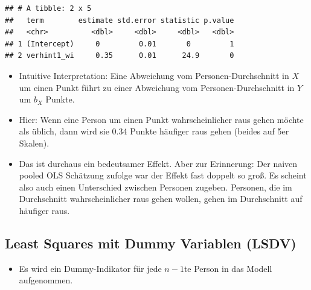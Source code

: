 \documentclass[
]{book}
\newenvironment{Shaded}{\begin{snugshade}}{\end{snugshade}}
\newcommand{\DataTypeTok}[1]{\textcolor[rgb]{0.13,0.29,0.53}{#1}}
\newcommand{\DecValTok}[1]{\textcolor[rgb]{0.00,0.00,0.81}{#1}}
\newcommand{\KeywordTok}[1]{\textcolor[rgb]{0.13,0.29,0.53}{\textbf{#1}}}
\newcommand{\NormalTok}[1]{#1}
\newcommand{\OperatorTok}[1]{\textcolor[rgb]{0.81,0.36,0.00}{\textbf{#1}}}
\newcommand{\StringTok}[1]{\textcolor[rgb]{0.31,0.60,0.02}{#1}}
\providecommand{\tightlist}{%
  \setlength{\itemsep}{0pt}\setlength{\parskip}{0pt}}
\begin{document}
\begin{Shaded}
\end{Shaded}

\begin{verbatim}
## # A tibble: 2 x 5
##   term        estimate std.error statistic p.value
##   <chr>          <dbl>     <dbl>     <dbl>   <dbl>
## 1 (Intercept)     0         0.01       0         1
## 2 verhint1_wi     0.35      0.01      24.9       0
\end{verbatim}

\begin{itemize}
\tightlist
\item
  Intuitive Interpretation: Eine Abweichung vom Personen-Durchschnitt in \(X\) um einen Punkt führt zu einer Abweichung vom Personen-Durchschnitt in \(Y\) um \(b_{X}\) Punkte.
\item
  Hier: Wenn eine Person um einen Punkt wahrscheinlicher raus gehen möchte als üblich, dann wird sie 0.34 Punkte häufiger raus gehen (beides auf 5er Skalen).
\item
  Das ist durchaus ein bedeutsamer Effekt. Aber zur Erinnerung: Der naiven pooled OLS Schätzung zufolge war der Effekt fast doppelt so groß. Es scheint also auch einen Unterschied zwischen Personen zugeben. Personen, die im Durchschnitt wahrscheinlicher raus gehen wollen, gehen im Durchschnitt auf häufiger raus.
\end{itemize}

\hypertarget{least-squares-mit-dummy-variablen-lsdv}{%
\subsection*{Least Squares mit Dummy Variablen (LSDV)}\label{least-squares-mit-dummy-variablen-lsdv}}

\begin{itemize}
\tightlist
\item
  Es wird ein Dummy-Indikator für jede \(n-1\)te Person in das Modell aufgenommen.
\end{itemize}
\end{document}
